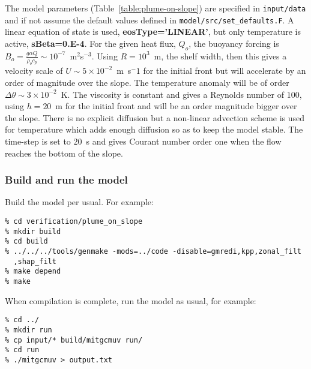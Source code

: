 The model parameters (Table~\ref{table:plume-on-slope}) are specified
in {\tt input/data} and if not assume the default values defined in
{\tt model/src/set\_defaults.F}. A linear equation of state is used,
{\bf eosType='LINEAR'}, but only temperature is active, {\bf
sBeta=0.E-4}. For the given heat flux, $Q_o$, the buoyancy forcing is
$B_o = \frac{g \alpha Q}{\rho_o c_p} \sim
10^{-7}$~m$^2$s$^{-3}$. Using $R=10^3$~m, the shelf width, then this
gives a velocity scale of $U\sim 5 \times 10^{-2}$~m~s$^-1$ for the
initial front but will accelerate by an order of magnitude over the
slope. The temperature anomaly will be of order $\Delta \theta \sim 3
\times 10^{-2}$~K.  The viscosity is constant and gives a Reynolds
number of $100$, using $h=20$~m for the initial front and will be an
order magnitude bigger over the slope. There is no explicit diffusion
but a non-linear advection scheme is used for temperature which adds
enough diffusion so as to keep the model stable. The time-step is set
to $20$~s and gives Courant number order one when the flow reaches the
bottom of the slope.

\subsubsection{Build and run the model}

Build the model per usual. For example:
\begin{verbatim}
% cd verification/plume_on_slope
% mkdir build
% cd build
% ../../../tools/genmake -mods=../code -disable=gmredi,kpp,zonal_filt
  ,shap_filt
% make depend
% make
\end{verbatim}

When compilation is complete, run the model as usual, for example:
\begin{verbatim}
% cd ../
% mkdir run
% cp input/* build/mitgcmuv run/
% cd run
% ./mitgcmuv > output.txt
\end{verbatim}
